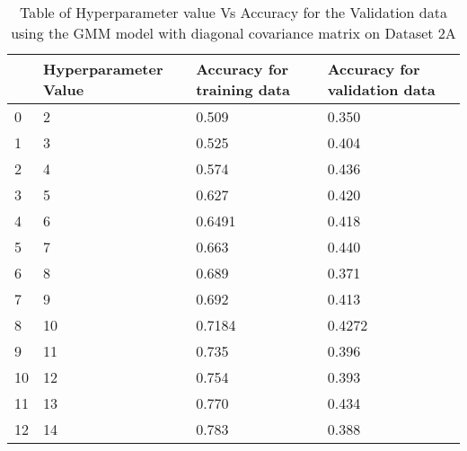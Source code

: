 
\begin{table}[]
    \centering
    
        \begin{tabular}{|l|l|l|l|}
\hline
&Hyperparameter Value&Accuracy for training data&Accuracy for validation data\\
\hline
0&2&0.509&0.350\\
\hline
1&3&0.525&0.404\\
\hline
2&4&0.574&0.436\\
\hline
3&5&0.627&0.420\\
\hline
4&6&0.6491&0.418\\
\hline
5&7&0.663&0.440\\
\hline
6&8&0.689&0.371\\
\hline
7&9&0.692&0.413\\
\hline
8&10&0.7184&0.4272\\
\hline
9&11&0.735&0.396\\
\hline
10&12&0.754&0.393\\
\hline
11&13&0.770&0.434\\
\hline
12&14&0.783&0.388\\
\hline
\end{tabular}
\caption{Table of Hyperparameter value Vs Accuracy for the Validation data using the GMM model with diagonal covariance matrix on Dataset 2A}
    \label{tab:acc2a}
\end{table}
